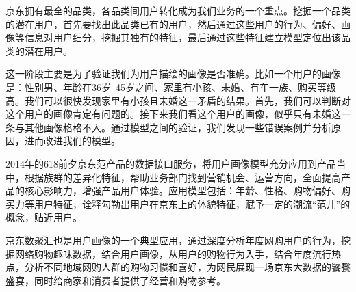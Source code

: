		京东拥有最全的品类，各品类间用户转化成为我们业务的一个重点。挖掘一个品类的潜在用户，首先要找出此品类已有的用户，然后通过这些用户的行为、偏好、画像等信息对用户细分，挖掘其独有的特征，最后通过这些特征建立模型定位出该品类的潜在用户。

		这一阶段主要是为了验证我们为用户描绘的画像是否准确。比如一个用户的画像是：性别男、年龄在36岁~45岁之间、家里有小孩、未婚、有车一族、购买等级高。我们可以很快发现家里有小孩且未婚这一矛盾的结果。首先，我们可以判断对这个用户的画像肯定有问题的。接下来我们看这个用户的画像，似乎只有未婚这一条与其他画像格格不入。通过模型之间的验证，我们发现一些错误案例并分析原因，进而改进我们的模型。

		2014年的618前夕京东范产品的数据接口服务，将用户画像模型充分应用到产品当中，根据族群的差异化特征，帮助业务部门找到营销机会、运营方向，全面提高产品的核心影响力，增强产品用户体验。应用模型包括：年龄、性格、购物偏好、购买力等用户特征，诠释勾勒出用户在京东上的体貌特征，赋予一定的潮流“范儿”的概念，贴近用户。

		京东数聚汇也是用户画像的一个典型应用，通过深度分析年度网购用户的行为，挖掘网络购物趣味数据，结合用户画像，从用户的购物行为入手，结合年度流行热点，分析不同地域网购人群的购物习惯和喜好，为网民展现一场京东大数据的饕餮盛宴，同时给商家和消费者提供了经营和购物参考。

